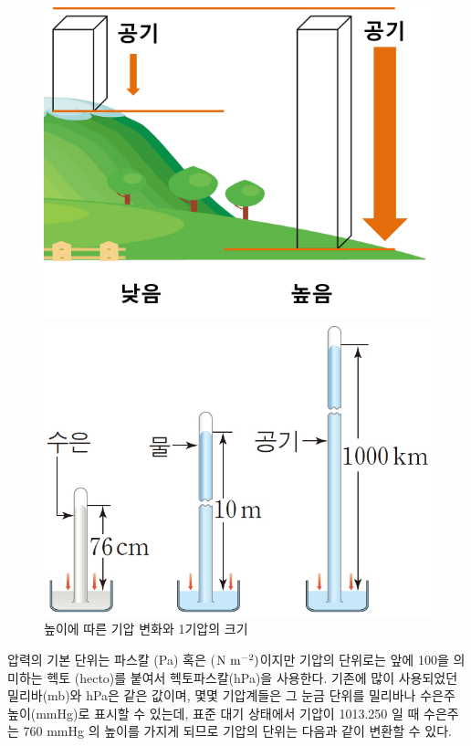 \begin{figure}[h]
	\centering
	\begin{minipage}{.45\textwidth}
	\centering	
	\includegraphics[width=0.95\linewidth]{21observing/images/airPressuire}
	\end{minipage}
	\begin{minipage}{.45\textwidth}
	\centering
	\includegraphics[width=0.95\linewidth]{21observing/images/4_14_a_7}
	\end{minipage}
	\caption{높이에 따른 기압 변화와 1기압의 크기}
	\label{fig:414a7}
\end{figure}

압력의 기본 단위는 파스칼 (Pa) 혹은 ($\rm {N~m^{-2}})$이지만 기압의 단위로는 앞에 100을 의미하는 헥토 (hecto)를 붙여서 헥토파스칼(hPa)을 사용한다. 기존에 많이 사용되었던 밀리바(mb)와 hPa은 같은 값이며, 몇몇 기압계들은 그 눈금 단위를 밀리바나 수은주 높이(mmHg)로 표시할 수 있는데, 표준 대기 상태에서 기압이 1013.250 일 때 수은주는 760 mmHg 의 높이를 가지게 되므로 기압의 단위는 다음과 같이 변환할 수 있다.
	
